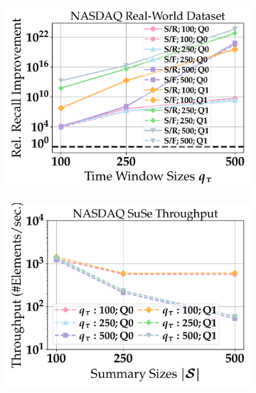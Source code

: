 \begin{figure}[t]
	\centering
	\begin{subfigure}{.32\linewidth}
		\centering
		\includegraphics[width=1.0\linewidth]{revision_plots/NASDAQ_queries.pdf}
		\vspace{-15pt}
		\caption{}
		\label{plot:nasdaq_average_total_match_ratio}
	\end{subfigure}
	\begin{subfigure}{.32\linewidth}
		\centering
		\includegraphics[width=1.0\linewidth]{revision_plots/NASDAQ_throughput_lineplot.pdf}
		\vspace{-15pt}
		\caption{}
		\label{plot:nasdaq_throughput}
	\end{subfigure}

\end{figure}
